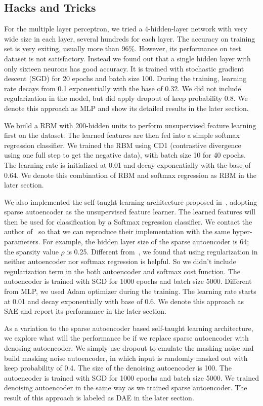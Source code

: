 \subsection{Hacks and Tricks}
For the multiple layer perceptron, we tried a 4-hidden-layer network with
very wide size in each layer, several hundreds for each layer.
The accuracy on training set is very exiting, usually more than 96\%.
However, its performance on test dataset is not satisfactory.
Instead we found out that a single hidden layer with only sixteen neurons has good accuracy.
It is trained with stochastic gradient descent (SGD) for 20 epochs and batch size 100.
During the training, learning rate decays from 0.1 exponentially with the base of 0.32.
We did not include regularization in the model, but did apply dropout of keep probability 0.8.
We denote this approach as MLP and show its detailed results in the later section.

We build a RBM with 200-hidden units to perform unsupervised feature learning first on the dataset.
The learned features are then fed into a simple softmax regression classifier.
We trained the RBM using CD1 (contrastive divergence using one full step to get the negative data),
with batch size 10 for 40 epochs.
The learning rate is initialized at 0.01 and decay exponentially with the base of 0.64.
We denote this combination of RBM and softmax regression as RBM in the later section.

We also implemented the self-taught learning architecture proposed in~\cite{STL-NIDS, SparseAE},
adopting sparse autoencoder as the unsupervised feature learner.
The learned features will then be used for classification by a Softmax regression classifier.
We contact the author of~\cite{STL-NIDS} so that we can reproduce their implementation
with the same hyper-parameters.
For example, the hidden layer size of the sparse autoencoder is 64;
the sparsity value $\rho$ is 0.25.
Different from~\cite{STL-NIDS}, we found that using regularization in
neither autoencoder nor softmax regression is helpful.
So we didn't include regularization term in the both autoencoder and softmax cost function.
The autoencoder is trained with SGD for 1000 epochs and batch size 5000.
Different from MLP, we used Adam optimizer during the training.
The learning rate starts at 0.01 and decay exponentially with base of 0.6.
We denote this approach as SAE and report its performance in the later section.

As a variation to the sparse autoencoder based self-taught learning architecture,
we explore what will the performance be if we replace sparse autoencoder with denosing autoencoder.
We simply use dropout to emulate the masking noise and build masking noise autoencoder,
in which input is randomly masked out with keep probability of 0.4.
The size of the denoising autoencoder is 100.
The autoencoder is trained with SGD for 1000 epochs and batch size 5000.
We trained denoising autoencoder in the same way as we trained sparse autoencoder.
The result of this approach is labeled as DAE in the later section.

